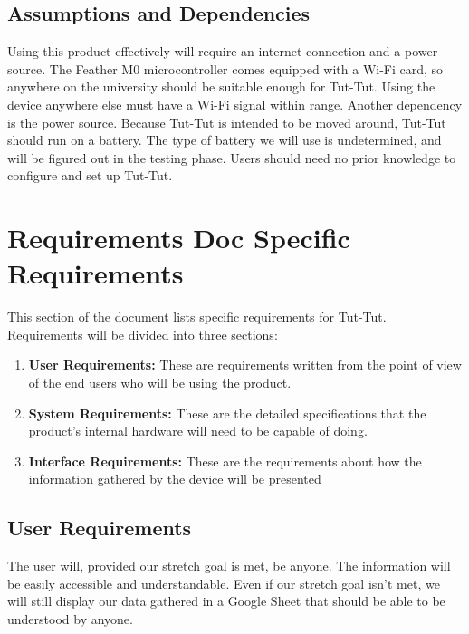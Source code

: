 \documentclass[letterpaper,10pt,draftclsnofoot,onecolumn]{article}
\begin{document}
\subsection{Assumptions and Dependencies}
Using this product effectively will require an internet connection and a power source. The Feather M0 microcontroller comes equipped with a Wi-Fi card, so anywhere on the university should be suitable enough for Tut-Tut. Using the device anywhere else must have a Wi-Fi signal within range. Another dependency is the power source. Because Tut-Tut is intended to be moved around, Tut-Tut should run on a battery. The type of battery we will use is undetermined, and will be figured out in the testing phase. Users should need no prior knowledge to configure and set up Tut-Tut.

\section{Requirements Doc Specific Requirements}
This section of the document lists specific requirements for Tut-Tut. Requirements will be divided into three sections:
\begin{enumerate}
    \item \textbf{User Requirements: } These are requirements written from the point of view of the end users who will be using the product.
    \item \textbf{System Requirements: } These are the detailed specifications that the product's internal hardware will need to be capable of doing.
    \item \textbf{Interface Requirements: } These are the requirements about how the information gathered by the device will be presented 
\end{enumerate}

\subsection{User Requirements}
The user will, provided our stretch goal is met, be anyone. The information will be easily accessible and understandable. Even if our stretch goal isn't met, we will still display our data gathered in a Google Sheet that should be able to be understood by anyone.
\end{document}
